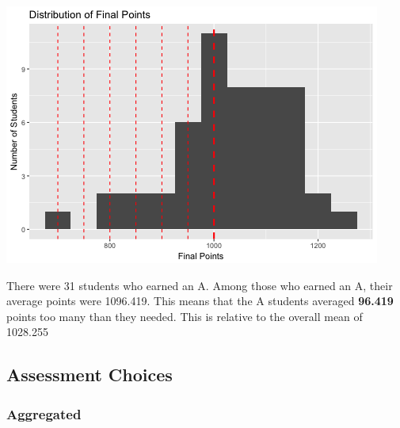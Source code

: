 \documentclass[]{article}
\begin{document}
\includegraphics{figures/points-distribution-1.png}

There were 31 students who earned an A. Among those who earned an A,
their average points were 1096.419. This means that the A students
averaged \textbf{96.419} points too many than they needed. This is
relative to the overall mean of 1028.255

\subsection{Assessment Choices}\label{assessment-choices}

\subsubsection{Aggregated}\label{aggregated}
\end{document}
